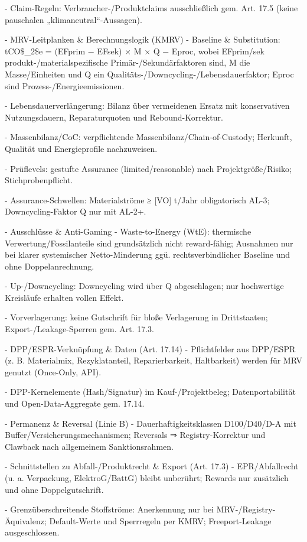 \documentclass[12pt,a4paper]{scrartcl}
\begin{document}
- Claim-Regeln: Verbraucher-/Produktclaims ausschließlich gem. Art. 17.5 (keine pauschalen „klimaneutral“-Aussagen).

- MRV-Leitplanken \& Berechnungslogik (KMRV)
- Baseline \& Substitution: tCO\$\_2\$e = (EFprim − EFsek) × M × Q − Eproc, wobei EFprim/sek produkt-/materialspezifische Primär-/Sekundärfaktoren sind, M die Masse/Einheiten und Q ein Qualitäts-/Downcycling-/Lebensdauerfaktor; Eproc sind Prozess-/Energieemissionen.

- Lebensdauerverlängerung: Bilanz über vermeidenen Ersatz mit konservativen Nutzungsdauern, Reparaturquoten und Rebound-Korrektur.

- Massenbilanz/CoC: verpflichtende Massenbilanz/Chain-of-Custody; Herkunft, Qualität und Energieprofile nachzuweisen.

- Prüflevels: gestufte Assurance (limited/reasonable) nach Projektgröße/Risiko; Stichprobenpflicht.

- Assurance-Schwellen: Materialströme ≥ [VO] t/Jahr obligatorisch AL-3; Downcycling-Faktor Q nur mit AL-2+.

- Ausschlüsse \& Anti-Gaming
- Waste-to-Energy (WtE): thermische Verwertung/Fossilanteile sind grundsätzlich nicht reward-fähig; Ausnahmen nur bei klarer systemischer Netto-Minderung ggü. rechtsverbindlicher Baseline und ohne Doppelanrechnung.

- Up-/Downcycling: Downcycling wird über Q abgeschlagen; nur hochwertige Kreisläufe erhalten vollen Effekt.

- Vorverlagerung: keine Gutschrift für bloße Verlagerung in Drittstaaten; Export-/Leakage-Sperren gem. Art. 17.3.

- DPP/ESPR-Verknüpfung \& Daten (Art. 17.14)
- Pflichtfelder aus DPP/ESPR (z. B. Materialmix, Rezyklatanteil, Reparierbarkeit, Haltbarkeit) werden für MRV genutzt (Once-Only, API).

- DPP-Kernelemente (Hash/Signatur) im Kauf-/Projektbeleg; Datenportabilität und Open-Data-Aggregate gem. 17.14.

- Permanenz \& Reversal (Linie B)
- Dauerhaftigkeitsklassen D100/D40/D-A mit Buffer/Versicherungsmechanismen; Reversals ⇒ Registry-Korrektur und Clawback nach allgemeinem Sanktionsrahmen.

- Schnittstellen zu Abfall-/Produktrecht \& Export (Art. 17.3)
- EPR/Abfallrecht (u. a. Verpackung, ElektroG/BattG) bleibt unberührt; Rewards nur zusätzlich und ohne Doppelgutschrift.

- Grenzüberschreitende Stoffströme: Anerkennung nur bei MRV-/Registry-Äquivalenz; Default-Werte und Sperrregeln per KMRV; Freeport-Leakage ausgeschlossen.
\end{document}
